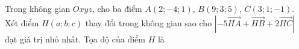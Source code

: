 \begin{ex}
Trong không gian $Oxyz$, cho ba điểm $A(2;-4;1)$, $B(9;3;5)$, $C(3;1;-1)$. Xét điểm $H(a;b;c)$ thay đổi trong không gian sao cho $\left|-5\overrightarrow{HA}+\overrightarrow{HB}+2\overrightarrow{HC}\right|$ đạt giá trị nhỏ nhất. Tọa độ của điểm $H$ là
\end{ex}
